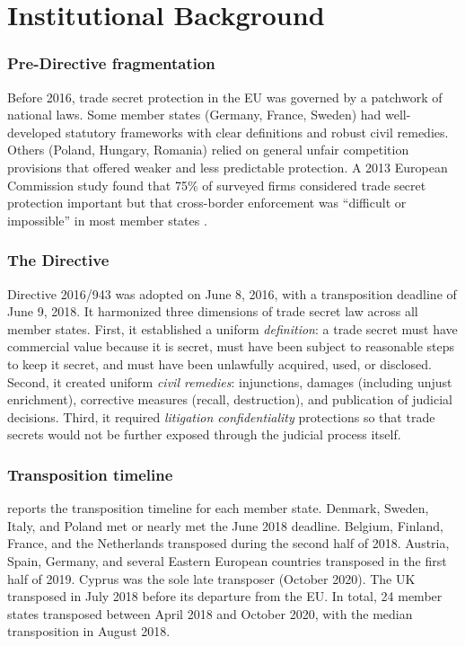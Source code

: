 \documentclass[12pt]{article}
\begin{document}
\section{Institutional Background}
\label{sec:background}

\subsubsection*{Pre-Directive fragmentation} Before 2016, trade secret protection in the EU was governed by a patchwork of national laws. Some member states (Germany, France, Sweden) had well-developed statutory frameworks with clear definitions and robust civil remedies. Others (Poland, Hungary, Romania) relied on general unfair competition provisions that offered weaker and less predictable protection. A 2013 European Commission study found that 75\% of surveyed firms considered trade secret protection important but that cross-border enforcement was ``difficult or impossible'' in most member states \citep{EC2013}.

\subsubsection*{The Directive} Directive 2016/943 was adopted on June 8, 2016, with a transposition deadline of June 9, 2018. It harmonized three dimensions of trade secret law across all member states. First, it established a uniform \textit{definition}: a trade secret must have commercial value because it is secret, must have been subject to reasonable steps to keep it secret, and must have been unlawfully acquired, used, or disclosed. Second, it created uniform \textit{civil remedies}: injunctions, damages (including unjust enrichment), corrective measures (recall, destruction), and publication of judicial decisions. Third, it required \textit{litigation confidentiality} protections so that trade secrets would not be further exposed through the judicial process itself.

\subsubsection*{Transposition timeline}  reports the transposition timeline for each member state. Denmark, Sweden, Italy, and Poland met or nearly met the June 2018 deadline. Belgium, Finland, France, and the Netherlands transposed during the second half of 2018. Austria, Spain, Germany, and several Eastern European countries transposed in the first half of 2019. Cyprus was the sole late transposer (October 2020). The UK transposed in July 2018 before its departure from the EU. In total, 24 member states transposed between April 2018 and October 2020, with the median transposition in August 2018.
\end{document}
